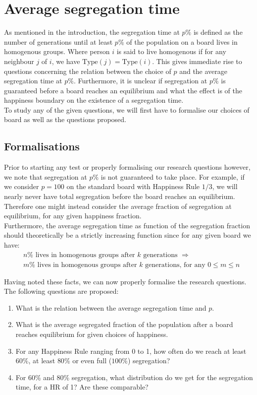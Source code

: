
\section{Average segregation time}\label{sec:aveseg}
As mentioned in the introduction, the segregation time at \(p\%\) is defined as the number of generations until at least \(p\%\) of the population on a board lives in homogenous groups. 
Where person \(i\) is said to live homogenous if for any neighbour \(j\) of \(i\), we have \(\text{Type}(j)=\text{Type}(i)\).
This gives immediate rise to questions concerning the relation between the choice of \(p\) and the average segregation time at \(p\%\). 
Furthermore, it is unclear if segregation at \(p\%\) is guaranteed before a board reaches an equilibrium and what the effect is of the happiness boundary on the existence of a segregation time.\\

To study any of the given questions, we will first have to formalise our choices of board as well as the questions proposed.\\


\subsection{Formalisations}
Prior to starting any test or properly formalising our research questions however, we note that segregation at \(p\%\) is not guaranteed to take place.
For example, if we consider \(p=100\) on the standard board with Happiness Rule \(1/3\), we will nearly never have total segregation before the board reaches an equilibrium.
Therefore one might instead consider the average fraction of segregation at equilibrium, for any given happiness fraction. \\

Furthermore, the average segregation time as function of the segregation fraction should theoretically be a strictly increasing function since for any given board we have:
\begin{align*}
&n\% \text{ lives in homogenous groups after } k \text{ generations } \Rightarrow\\
& m\% \text{ lives in homogenous groups after } k \text{ generations, for any } 0 \leq m \leq n
\end{align*} 

Having noted these facts, we can now properly formalise the research questions.\\
The following questions are proposed:
\begin{enumerate}
 \item What is the relation between the average segregation time and \(p\).
 \item What is the average segregated fraction of the population after a board reaches equilibrium for given choices of happiness.
 \item For any Happiness Rule ranging from 0 to 1, how often do we reach at least $60\%$, at least $80\%$ or even full ($100\%$) segregation?
 \item For $60\%$ and $80\%$ segregation, what distribution do we get for the segregation time, for a  HR of  1? Are these comparable?
\end{enumerate}

